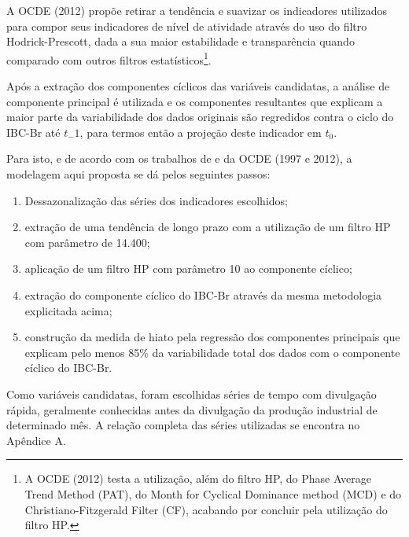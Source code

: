 \documentclass[
	article,			%
	11pt,				%
	oneside,			%
	a4paper,			%
	english,			%
	brazil,				%
	]{abntex2}
\begin{document}
{	A OCDE (2012) propõe retirar a tendência e suavizar os indicadores utilizados para compor seus indicadores de nível de atividade através do uso do filtro Hodrick-Prescott, dada a sua maior estabilidade e transparência quando comparado com outros filtros estatísticos\footnote{A OCDE (2012) testa a utilização, além do filtro HP, do Phase Average Trend Method (PAT), do Month for Cyclical Dominance method (MCD) e do Christiano-Fitzgerald Filter (CF), acabando por concluir pela utilização do filtro HP.}.
	
	Após a extração dos componentes cíclicos das variáveis candidatas, a análise de componente principal é utilizada e os componentes resultantes que explicam a maior parte da variabilidade dos dados originais são regredidos contra o ciclo do IBC-Br até $t_-1$, para termos então a projeção deste indicador em $t_0$.
	
	Para isto, e de acordo com os trabalhos de  e da OCDE (1997 e 2012), a modelagem aqui proposta se dá pelos seguintes passos:
	
	\begin{enumerate}
		\item Dessazonalização das séries dos indicadores escolhidos;
		\item extração de uma tendência de longo prazo com a utilização de um filtro HP com parâmetro de 14.400;
		\item aplicação de um filtro HP com parâmetro 10 ao componente cíclico;
		\item extração do componente cíclico do IBC-Br através da mesma metodologia explicitada acima;
		\item construção da medida de hiato pela regressão dos componentes principais que explicam pelo menos 85\% da variabilidade total dos dados com o componente cíclico do IBC-Br.
	\end{enumerate}
	
	Como variáveis candidatas, foram escolhidas séries de tempo com divulgação rápida, geralmente conhecidas antes da divulgação da produção industrial de determinado mês. A relação completa das séries utilizadas se encontra no Apêndice A.
	
		
		
		
}
\end{document}
